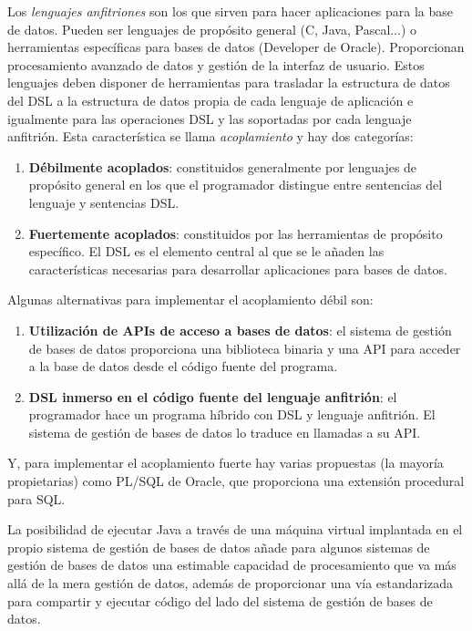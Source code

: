 \documentclass[10pt,a4paper,spanish]{report}
\begin{document}
Los \textit{\textcolor[rgb]{1,0.2,0.3}{lenguajes anfitriones}} son los que sirven para hacer aplicaciones para la base de datos. Pueden ser lenguajes de propósito general (C, Java, Pascal...) o herramientas específicas para bases de datos (Developer de Oracle). Proporcionan procesamiento avanzado de datos y gestión de la interfaz de usuario. Estos lenguajes deben disponer de herramientas para trasladar la estructura de datos del DSL a la estructura de datos propia de cada lenguaje de aplicación e igualmente para las operaciones DSL y las soportadas por cada lenguaje anfitrión. Esta característica se llama \textcolor[rgb]{1,0.2,0.3}{\textit{acoplamiento}} y hay dos categorías:

\begin{enumerate}[$\heartsuit$]
    \item \textcolor[rgb]{1,0.2,0.3}{\textbf{Débilmente acoplados}}: constituidos generalmente por lenguajes de propósito general en los que el programador distingue entre sentencias del lenguaje y sentencias DSL.
    \item \textcolor[rgb]{1,0.2,0.3}{\textbf{Fuertemente acoplados}}: constituidos por las herramientas de propósito específico. El DSL es el elemento central al que se le añaden las características necesarias para desarrollar aplicaciones para bases de datos.
\end{enumerate}

Algunas alternativas para implementar el acoplamiento débil son:

\begin{enumerate}[$\heartsuit$]
    \item \textcolor[rgb]{1,0.2,0.3}{\textbf{Utilización de APIs de acceso a bases de datos}}: el sistema de gestión de bases de datos proporciona una biblioteca binaria y una API para acceder a la base de datos desde el código fuente del programa.
    \item \textcolor[rgb]{1,0.2,0.3}{\textbf{DSL inmerso en el código fuente del lenguaje anfitrión}}: el programador hace un programa híbrido con DSL y lenguaje anfitrión. El sistema de gestión de bases de datos lo traduce en llamadas a su API.
\end{enumerate}

Y, para implementar el acoplamiento fuerte hay varias propuestas (la mayoría propietarias) como PL/SQL de Oracle, que proporciona una extensión procedural para SQL. 

La posibilidad de ejecutar Java a través de una máquina virtual implantada en el propio sistema de gestión de bases de datos añade para algunos sistemas de gestión de bases de datos una estimable capacidad de procesamiento que va más allá de la mera gestión de datos, además de proporcionar una vía estandarizada para compartir y ejecutar código del lado del sistema de gestión de bases de datos.
\end{document}
